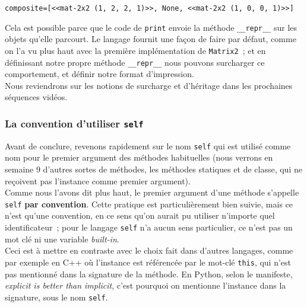     \begin{Verbatim}[commandchars=\\\{\}]
composite=[<<mat-2x2 (1, 2, 2, 1)>>, None, <<mat-2x2 (1, 0, 0, 1)>>]

    \end{Verbatim}

    Cela est possible parce que le code de \texttt{print} envoie la méthode
\texttt{\_\_repr\_\_} sur les objets qu'elle parcourt. Le langage
fournit une façon de faire par défaut, comme on l'a vu plus haut avec la
première implémentation de \texttt{Matrix2}~; et en définissant notre
propre méthode \texttt{\_\_repr\_\_} nous pouvons surcharger ce
comportement, et définir notre format d'impression.\\

    Nous reviendrons sur les notions de surcharge et d'héritage dans les
prochaines séquences vidéos.

    \hypertarget{la-convention-dutiliser-self}{%
\subsubsection{\texorpdfstring{La convention d'utiliser
\texttt{self}}{La convention d'utiliser self}}\label{la-convention-dutiliser-self}}

    Avant de conclure, revenons rapidement sur le nom \texttt{self} qui est
utilisé comme nom pour le premier argument des méthodes habituelles
(nous verrons en semaine 9 d'autres sortes de méthodes, les méthodes
statiques et de classe, qui ne reçoivent pas l'instance comme premier
argument).\\

Comme nous l'avons dit plus haut, le premier argument d'une méthode
s'appelle \texttt{self} \textbf{par convention}. Cette pratique est
particulièrement bien suivie, mais ce n'est qu'une convention, en ce
sens qu'on aurait pu utiliser n'importe quel identificateur~; pour le
langage \texttt{self} n'a aucun sens particulier, ce n'est pas un mot
clé ni une variable \emph{built-in}.\\

    Ceci est à mettre en contraste avec le choix fait dans d'autres
langages, comme par exemple en C++ où l'instance est référencée par le
mot-clé \texttt{this}, qui n'est pas mentionné dans la signature de la
méthode. En Python, selon le manifeste, \emph{explicit is better than
implicit}, c'est pourquoi on mentionne l'instance dans la signature,
sous le nom \texttt{self}.